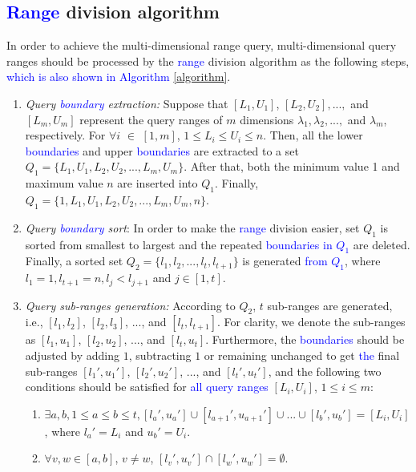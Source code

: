 \documentclass[IEEE JOURNAL OF BIOMEDICAL AND HEALTH INFORMATICS]{IEEEtran}
\begin{document}
{\subsection{\textcolor{blue}{Range} division algorithm}\label{sections division}
In order to achieve the multi-dimensional range query, multi-dimensional query ranges should be processed by the \textcolor{blue}{range} division algorithm as the following steps, \textcolor{blue}{which is also shown in Algorithm \ref{algorithm}}.
\begin{enumerate}
	\item \emph{Query \textcolor{blue}{boundary} extraction:} Suppose that $[L_1, U_1]$, $ [L_2, U_2],... ,$ and $[L_m, U_m]$ represent the query ranges of $m$ dimensions $\lambda_1, \lambda_2, ... ,$ and $\lambda_m$, respectively. For $\forall i$ $\in$ $ [1, m]$, $ 1 \le L_i \le U_i \le n$. Then, all the lower \textcolor{blue}{boundaries} and upper \textcolor{blue}{boundaries} are extracted to a set $Q_1=\{L_1 , U_1, L_2, U_2, ... , L_m, U_m\}$. After that, both the minimum value 1 and maximum value $n$ are inserted into $Q_1$. Finally, $Q_1=\{1, L_1 , U_1, L_2, U_2, ... , L_m, U_m, n\}$.
	\item \emph{Query \textcolor{blue}{boundary} sort}: In order to make the \textcolor{blue}{range} division easier, set $Q_1$ is sorted from smallest to largest and the repeated \textcolor{blue}{boundaries} \textcolor{blue}{in $Q_1$} are deleted. Finally, a sorted set $Q_2=\{l_1, l_2, ... , l_t, l_{t+1}\}$ is generated \textcolor{blue}{from $Q_1$}, where $l_1=1, l_{t+1}=n, l_j < l_{j+1}$ and $j \in [1, t]$.
	\item \emph{Query sub-ranges generation:} According to $Q_2$, $t$ sub-ranges are generated, i.e., $[l_1, l_2]$, $[l_2, l_3]$, $... $, and $[l_t, l_{t+1}]$. For clarity, we denote the sub-ranges as $[l_1, u_1]$, $[l_2, u_2]$, $... $, and $[l_t, u_t]$. Furthermore, the \textcolor{blue}{boundaries} should be adjusted by adding $1$, subtracting $1$ or remaining unchanged to get \textcolor{blue}{the} final sub-ranges $[l_1', u_1']$, $[l_2', u_2']$, $... $, and $[l_t', u_t'
	]$, and the following two conditions should be satisfied for \textcolor{blue}{all query ranges} $[L_i, U_i]$, $1\le i \le m$:
	\begin{enumerate}
		\item $\exists a, b, 1 \le a \le b \le t, [l_a',u_a'] \cup [l_{a+1}', u_{a+1}'] \cup ...  \cup [l_b', u_b'] = [L_i, U_i]$, where $l_a' = L_i$ and $u_b'=U_i$.
		\item $\forall v,w \in [a, b]$, $v \neq w$, $[l_v', u_v']\cap [l_w', u_w'] = \emptyset$.
	\end{enumerate}	
\end{enumerate}

}
\end{document}

